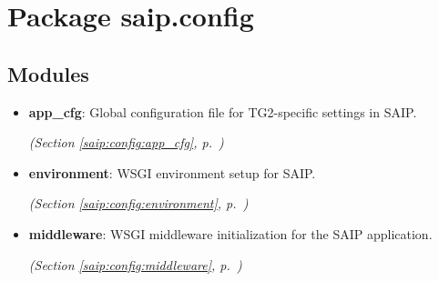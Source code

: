 %
%
%


\section{Package saip.config}

    \label{saip:config}


\subsection{Modules}

\begin{itemize}
\setlength{\parskip}{0ex}
\item \textbf{app\_cfg}: Global configuration file for TG2-specific settings in SAIP.



  \textit{(Section \ref{saip:config:app_cfg}, p.~\pageref{saip:config:app_cfg})}

\item \textbf{environment}: WSGI environment setup for SAIP.



  \textit{(Section \ref{saip:config:environment}, p.~\pageref{saip:config:environment})}

\item \textbf{middleware}: WSGI middleware initialization for the SAIP application.



  \textit{(Section \ref{saip:config:middleware}, p.~\pageref{saip:config:middleware})}

\end{itemize}



